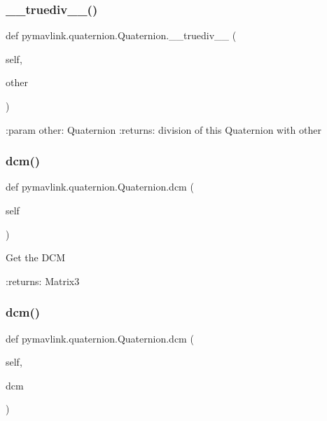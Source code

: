 \subsubsection{\texorpdfstring{\+\_\+\+\_\+truediv\+\_\+\+\_\+()}{\_\_truediv\_\_()}}
{\footnotesize\ttfamily def pymavlink.\+quaternion.\+Quaternion.\+\_\+\+\_\+truediv\+\_\+\+\_\+ (\begin{DoxyParamCaption}\item[{}]{self,  }\item[{}]{other }\end{DoxyParamCaption})}

\begin{DoxyVerb}:param other: Quaternion
:returns: division of this Quaternion with other
\end{DoxyVerb}
 \mbox{\label{classpymavlink_1_1quaternion_1_1Quaternion_a8c596178af38be093dd787c609d7da09}} 
\subsubsection{\texorpdfstring{dcm()}{dcm()}\hspace{0.1cm}{\footnotesize\ttfamily [1/2]}}
{\footnotesize\ttfamily def pymavlink.\+quaternion.\+Quaternion.\+dcm (\begin{DoxyParamCaption}\item[{}]{self }\end{DoxyParamCaption})}

\begin{DoxyVerb}Get the DCM

:returns: Matrix3
\end{DoxyVerb}
 \mbox{\label{classpymavlink_1_1quaternion_1_1Quaternion_a2223bcf5392e9fc3980e012074318707}} 
\subsubsection{\texorpdfstring{dcm()}{dcm()}\hspace{0.1cm}{\footnotesize\ttfamily [2/2]}}
{\footnotesize\ttfamily def pymavlink.\+quaternion.\+Quaternion.\+dcm (\begin{DoxyParamCaption}\item[{}]{self,  }\item[{}]{dcm }\end{DoxyParamCaption})}

